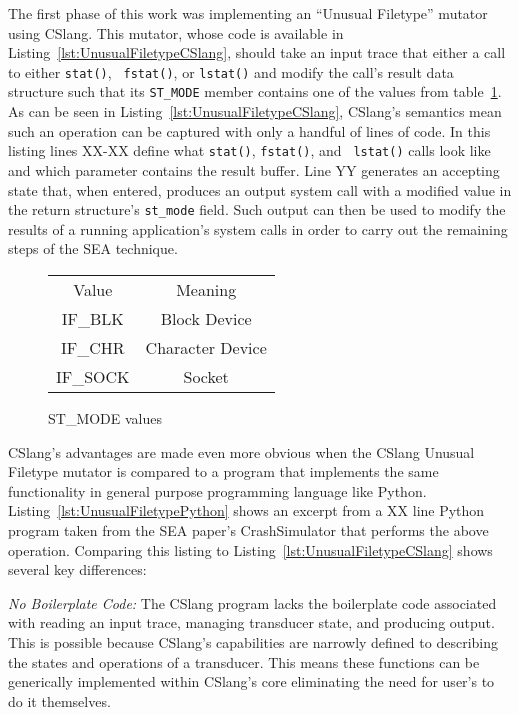 The first phase of this work was implementing an ``Unusual Filetype''
mutator using CSlang.
This mutator, whose code is available in
Listing~\ref{lst:UnusualFiletypeCSlang},
should take an input trace that either a call to either {\tt stat()}, {\tt
fstat()}, or {\tt lstat()} and modify the call's result data structure such
that its {\tt ST\_MODE} member contains one of the values from
table~\ref{tbl:ST_MODEValues}.  As can be seen in
Listing~\ref{lst:UnusualFiletypeCSlang}, CSlang's semantics mean such an
operation can be captured with only a handful of lines of code.  In this
listing lines XX-XX define what {\tt stat()}, {\tt fstat()}, and {\tt
lstat()} calls look like and which parameter contains the result buffer.
Line YY generates an accepting state that, when entered, produces an output
system call with a modified value in the return structure's {\tt st\_mode}
field.  Such output can then be used to modify the results of a running
application's system calls in order to carry out the remaining steps of the
SEA technique.

\begin{figure}
  \begin{tabular}{|c|c}
  Value    & Meaning          \\
  IF\_BLK  & Block Device     \\
  IF\_CHR  & Character Device \\
  IF\_SOCK & Socket           \\
\end{tabular}
\caption{ST\_MODE values}
\label{tbl:ST_MODEValues}
\end{figure}

CSlang's advantages are made even more obvious when the CSlang Unusual
Filetype mutator is compared to a program that implements the same
functionality in general purpose programming language like Python.
Listing~\ref{lst:UnusualFiletypePython} shows an excerpt from a XX line
Python program taken from the SEA paper's CrashSimulator that performs the
above operation.  Comparing this listing to
Listing~\ref{lst:UnusualFiletypeCSlang} shows several key differences:

\textit{No Boilerplate Code:} The CSlang program lacks the boilerplate
code associated with
reading an input trace, managing transducer state, and producing output.
This is possible because CSlang's capabilities are narrowly defined to
describing the states and operations of a transducer.  This means these
functions can be generically implemented within CSlang's core eliminating
the need for user's to do it themselves.

